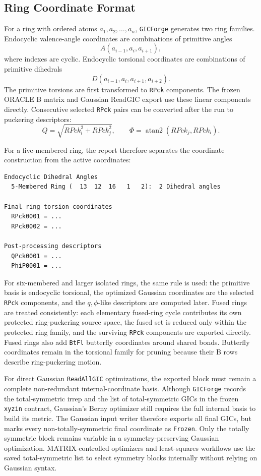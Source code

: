 \documentclass[11pt]{article}
\newcommand{\program}{\texttt{GICForge}}
\newcommand{\xyzin}{\texttt{xyzin}}
\begin{document}
\subsection{Ring Coordinate Format}

For a ring with ordered atoms \(a_1,a_2,\ldots,a_n\), \program{} generates two
ring families.  Endocyclic valence-angle coordinates are combinations of
primitive angles
\[
  A(a_{i-1},a_i,a_{i+1}),
\]
where indexes are cyclic.  Endocyclic torsional coordinates are combinations
of primitive dihedrals
\[
  D(a_{i-1},a_i,a_{i+1},a_{i+2}).
\]
The primitive torsions are first transformed to \texttt{RPck} components.  The
frozen ORACLE B matrix and Gaussian ReadGIC export use these linear components
directly.  Consecutive selected \texttt{RPck} pairs can be converted after the
run to puckering descriptors:
\[
  Q = \sqrt{RPck_i^2 + RPck_j^2}, \qquad
  \Phi = \operatorname{atan2}(RPck_j,RPck_i).
\]

For a five-membered ring, the report therefore separates the coordinate
construction from the active coordinates:

\begin{lstlisting}[style=oracle]
Endocyclic Dihedral Angles
  5-Membered Ring (  13  12  16   1   2):  2 Dihedral angles

Final ring torsion coordinates
  RPck0001 = ...
  RPck0002 = ...

Post-processing descriptors
  QPck0001 = ...
  PhiP0001 = ...
\end{lstlisting}

\noindent
For six-membered and larger isolated rings, the same rule is used: the
primitive basis is endocyclic torsional, the optimized Gaussian coordinates are
the selected \texttt{RPck} components, and the \(q,\phi\)-like descriptors are
computed later.  Fused rings are treated consistently: each elementary
fused-ring cycle contributes its own protected ring-puckering source space, the
fused set is reduced only within the protected ring family, and the surviving
\texttt{RPck} components are exported directly.
Fused rings also add \texttt{BtFl} butterfly coordinates around shared bonds.
Butterfly coordinates remain in the torsional family for pruning because their
B rows describe ring-puckering motion.

For direct Gaussian \texttt{ReadAllGIC} optimizations, the exported block must
remain a complete non-redundant internal-coordinate basis.  Although
\program{} records the total-symmetric irrep and the list of total-symmetric
GICs in the frozen \xyzin{} contract, Gaussian's Berny optimizer still requires
the full internal basis to build its metric.  The Gaussian input writer
therefore exports all final GICs, but marks every non-totally-symmetric final
coordinate as \texttt{Frozen}.  Only the totally symmetric block remains
variable in a symmetry-preserving Gaussian optimization.  MATRIX-controlled
optimizers and least-squares workflows use the saved total-symmetric list to
select symmetry blocks internally without relying on Gaussian syntax.
\end{document}

